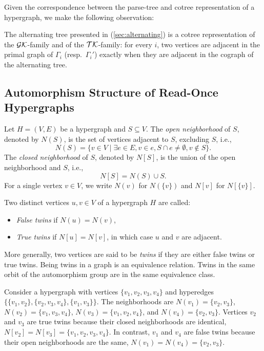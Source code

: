 \cite{CLB81}

Given the correspondence between the parse-tree and cotree representation of a hypergraph, we make the following observation:

\begin{observation}
The alternating tree presented in \cite{Her04} (\ref{sec:alternating}) is a cotree representation of the $\mathcal{GK}$-family and of the $\mathcal{TK}$-family: for every $i$, two vertices are adjacent in the primal graph of $\Gamma_i$ (resp.\ $\Gamma_i'$) exactly when they are adjacent in the cograph of the alternating tree.
\end{observation}

\subsection{Automorphism Structure of Read-Once Hypergraphs}

\begin{definition}
Let $H=(V,E)$ be a hypergraph and $S\subseteq V$. The \emph{open neighborhood} of $S$, denoted by $N(S)$, is the set of vertices adjacent to $S$, excluding $S$, i.e.,
\[
N(S)=\{v\in V\mid\exists e\in E,v\in e,S\cap e\neq\emptyset,v\notin S\}.
\]
The \emph{closed neighborhood} of $S$, denoted by $N[S]$, is the union of the open neighborhood and $S$, i.e.,
\[
N[S]=N(S)\cup S.
\]
For a single vertex $v\in V$, we write $N(v)$ for $N(\{v\})$ and $N[v]$ for $N[\{v\}]$.
\end{definition}

\begin{definition}
Two distinct vertices $u,v\in V$ of a hypergraph $H$ are called:
\begin{itemize}
\item \emph{False twins} if $N(u)=N(v)$,
\item \emph{True twins} if $N[u]=N[v]$, in which case $u$ and $v$ are adjacent.
\end{itemize}
\end{definition}

More generally, two vertices are said to be \emph{twins} if they are either false twins or true twins. Being twins in a graph is an equivalence relation. Twins in the same orbit of the automorphism group are in the same equivalence class.

Consider a hypergraph with vertices $\{v_1,v_2,v_3,v_4\}$ and hyperedges $\{\{v_1,v_2\},\{v_2,v_3,v_4\},\{v_1,v_3\}\}$. The neighborhoods are $N(v_1)=\{v_2,v_3\}$, $N(v_2)=\{v_1,v_3,v_4\}$, $N(v_3)=\{v_1,v_2,v_4\}$, and $N(v_4)=\{v_2,v_3\}$. Vertices $v_2$ and $v_3$ are true twins because their closed neighborhoods are identical, $N[v_2]=N[v_3]=\{v_1,v_2,v_3,v_4\}$. In contrast, $v_1$ and $v_4$ are false twins because their open neighborhoods are the same, $N(v_1)=N(v_4)=\{v_2,v_3\}$.

